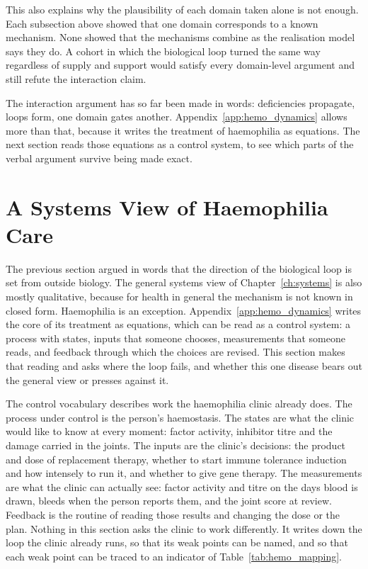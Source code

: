 This also explains why the plausibility of each domain taken alone is not enough. Each subsection above showed that one domain corresponds to a known mechanism. None showed that the mechanisms combine as the realisation model says they do. A cohort in which the biological loop turned the same way regardless of supply and support would satisfy every domain-level argument and still refute the interaction claim.

The interaction argument has so far been made in words: deficiencies
propagate, loops form, one domain gates another. Appendix~\ref{app:hemo_dynamics}
allows more than that, because it writes the treatment of haemophilia as
equations. The next section reads those equations as a control system, to see
which parts of the verbal argument survive being made exact.

\section{A Systems View of Haemophilia Care}
\label{sec:hemo_systems}

\noindent The previous section argued in words that the direction of the biological loop is set from outside biology. The general systems view of Chapter~\ref{ch:systems} is also mostly qualitative, because for health in general the mechanism is not known in closed form. Haemophilia is an exception. Appendix~\ref{app:hemo_dynamics} writes the core of its treatment as equations, which can be read as a control system: a process with states, inputs that someone chooses, measurements that someone reads, and feedback through which the choices are revised. This section makes that reading and asks where the loop fails, and whether this one disease bears out the general view or presses against it.

The control vocabulary describes work the haemophilia clinic already does. The process under control is the person's haemostasis. The states are what the clinic would like to know at every moment: factor activity, inhibitor titre and the damage carried in the joints. The inputs are the clinic's decisions: the product and dose of replacement therapy, whether to start immune tolerance induction and how intensely to run it, and whether to give gene therapy. The measurements are what the clinic can actually see: factor activity and titre on the days blood is drawn, bleeds when the person reports them, and the joint score at review. Feedback is the routine of reading those results and changing the dose or the plan. Nothing in this section asks the clinic to work differently. It writes down the loop the clinic already runs, so that its weak points can be named, and so that each weak point can be traced to an indicator of Table~\ref{tab:hemo_mapping}.


